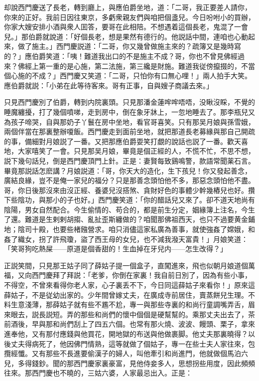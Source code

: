 却說西門慶送了長老，轉到廳上，與應伯爵坐地，道：「二哥，我正要差人請你，你來的正好。我前日因往東京，多虧衆親友們與咱把個盞兒。今日吩咐小的買辦，你家大嫂安排小酒與衆人囬答，要哥在此相陪。不想遇着這個長老，鬼混了一會兒。」那伯爵就說道：「好個長老，想是果然有德行的。他説話中間，連咱也心動起來，做了施主。」西門慶説道：「二哥，你又幾曾做施主來的？疏簿又是幾時寫的？」應伯爵笑道：「咦！難道我出口的不是施主不成？哥，你也不曾見佛經過來？佛經上第一重的是心施，第二法施，第三纔是財施。難道我従傍攛掇的，不當個心施的不成？」西門慶又笑道：「二哥，只怕你有口無心哩！」兩人拍手大笑。應伯爵就説：「小弟在此等待客來。哥有正事，自與嫂子商議去來。」

只見西門慶別了伯爵，轉到内院裏頭。只見那潘金蓮哰哰唔唔，没瞅沒睬，不覺的睡魔纏擾，打了幾個噴㖒，走到房中，倒在象牙牀上，一忽地睡去了。那李瓶兒又為孩子啼哭，自與那奶子丫鬟在房中坐地，看官哥喜笑。只有那吴月娘與孫雪娥，兩個伴當在那裏整辦嗄飯。西門慶走到面前坐地，就把那道長老募緣與那自己開疏的事，備細對月娘説了一番。又把那應伯爵耍笑打覷的說話也説了一番。歡天喜地，大家嘻笑了一會。只見那吴月娘，畢竟是個正經的人，不慌不忙，不思不想，説下幾句話兒，倒是西門慶頂門上針。正是：妻賢每致鷄鳴警，款語常聞薬石言。畢竟那説話怎麽講？月娘説道：「哥，你天大的造化，生下孩兒！你又發起善念，廣結良緣，豈不是俺一家兒的福分？只是那善念頭怕他不多，那惡念頭怕他不盡。哥，你日後那沒來由沒正經、養婆兒沒搭煞、貪財好色的事體少幹幾樁兒也好。攢下些陰功，與那小的子也好。」西門慶笑道：「你的醋話兒又來了。卻不道天地尚有陰陽，男女自然配合。今生偷情的、苟合的，都是前生分定，姻緣簿上注名，今生了還。難道是生剌剌胡搊、亂扯歪斯纏做的？咱聞那佛祖西天，也只不過要黄金鋪地；陰司十殿，也要些楮鏹營求。咱只消儘這家私廣為善事，就使強姦了嫦娥，和姦了織女，拐了許飛瓊，盜了西王母的女兒，也不減我潑天富貴！」月娘笑道：「笑哥狗吃熱屎——原道是個香甜的！生血掉在牙兒内——怎生改得？」

正説笑間，只見那王姑子同了薛姑子提一個盒子，直闖進來，飛也似朝月娘道個萬福，又向西門慶拜了拜説：「老爹，你倒在家裏！我自前日別了，因為有些小事，不得空，不曾來看得你老人家，心子裏丢不下，今日同這薛姑子來看你！」原來這薛姑子，不是従幼出家的。少年間曾嫁丈夫，在廣成寺前居住，賣蒸餅兒生理。不料生意淺薄，那薛姑子就有些不尷不尬，專一與那些寺裏的和尚行童調嘴弄舌，眉來眼去，説長説短。弄的那些和尚們的懷中個個是硬幫幫的。乘那丈夫出去了，茶前酒後，早與那和尚們刮上了四五六個。也常有那火燒、波波、饅頭、栗子，拿來進奉他，又有那付應錢與他買花，開地獄的布送與他做裹脚。他丈夫那裏曉得？以後丈夫得病死了，他因佛門情熟，這等就做了個姑子，專一在些士夫人家往來，包攬經懺。又有那些不長進要偷漢子的婦人，叫他牽引和尚進門，他就做個馬泊六兒，多得錢鈔。聞的那西門慶家裏豪富，見他侍妾多人，思想拐些用度，因此頻頻往來。那西門慶也不曉的，三姑六婆，人家最忌出入。正是：

